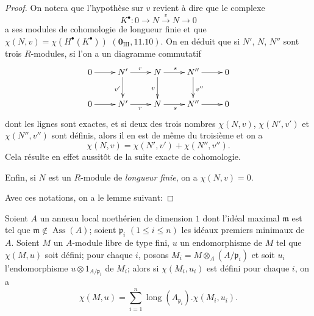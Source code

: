 \begin{proof}
On notera que l'hypothèse sur $v$ revient à dire que le complexe
\[
  K^\bullet:0\to N\xrightarrow{v}N\to0
\]
a ses modules de cohomologie de longueur finie et que $\chi(N,v)=\chi(H^\bullet(K^\bullet))$ $(\mathbf{0}_{\mathrm{III}},11.10)$.
On en déduit que si $N'$, $N$, $N''$ sont trois $R$-modules, si l'on a un diagramme commutatif
\[
  \xymatrix{
    0 \ar[r] & N' \ar[r]^r \ar[d]_{v'} & N \ar[r]^s \ar[d]_v & N'' \ar[r] \ar[d]^{v''} & 0\\
    0 \ar[r] & N' \ar[r]_r & N \ar[r]_s & N'' \ar[r] & 0
  }
\]
dont les lignes sont exactes, et si deux des trois nombres $\chi(N,v)$, $\chi(N',v')$ et $\chi(N'',v'')$ sont définis, alors il en est de même du troisième et on a
\[
\label{IV.21.10.17.6}
  \chi(N,v)=\chi(N',v')+\chi(N'',v'').
  \tag{21.10.17.6}
\]
Cela résulte en effet aussitôt de la suite exacte de cohomologie.

Enfin, si $N$ est un $R$-module de \emph{longueur finie}, on a $\chi(N,v)=0$.

Avec ces notations, on a le lemme suivant:
\end{proof}

\begin{lemma}[21.10.17.7]
\label{IV.21.10.17.7}
Soient $A$ un anneau local noethérien de dimension $1$ dont l'idéal maximal $\mathfrak{m}$ est tel que $\mathfrak{m}\notin\operatorname{Ass}(A)$;
soient $\mathfrak{p}_i$ $(1\leq i\leq n)$ les idéaux premiers minimaux de $A$.
Soient $M$ un $A$-module libre de type fini, $u$ un endomorphisme de $M$ tel que $\chi(M,u)$ soit défini;
pour chaque $i$, posons $M_i=M\otimes_A(A/\mathfrak{p}_i)$ et soit $u_i$ l'endomorphisme $u\otimes1_{A/\mathfrak{p}_i}$ de $M_i$;
alors si $\chi(M_i,u_i)$ est défini pour chaque $i$, on a
\[
\label{IV.21.10.17.8}
  \chi(M,u)=\sum_{i=1}^n\operatorname{long}(A_{\mathfrak{p}_i}).\chi(M_i,u_i).
  \tag{21.10.17.8}
\]
\end{lemma}

